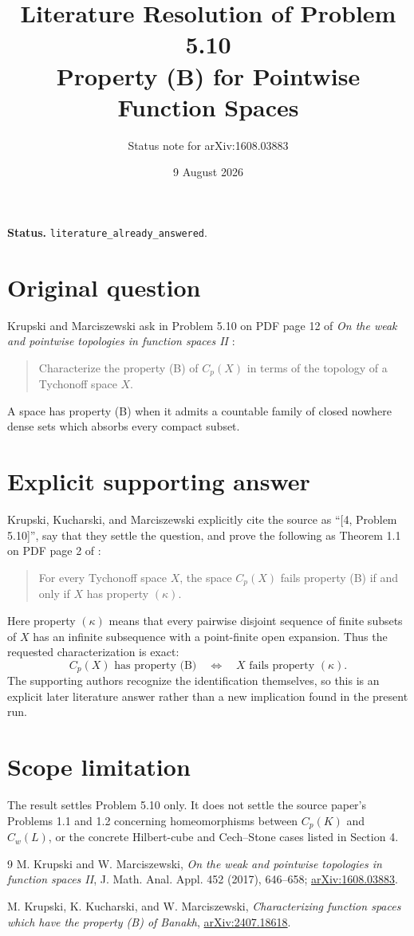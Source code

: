 \documentclass[10pt]{article}
\title{Literature Resolution of Problem 5.10\\
\large Property (B) for Pointwise Function Spaces}
\author{Status note for arXiv:1608.03883}
\date{9 August 2026}
\newcommand{\Cp}{C_p}
\begin{document}
\maketitle

\noindent\textbf{Status.} \texttt{literature\_already\_answered}.

\section*{Original question}
Krupski and Marciszewski ask in Problem 5.10 on PDF page 12 of
\emph{On the weak and pointwise topologies in function spaces II}
\cite{KM2017}:
\begin{quote}
Characterize the property (B) of $\Cp(X)$ in terms of the topology of a
Tychonoff space $X$.
\end{quote}
A space has property (B) when it admits a countable family of closed nowhere
dense sets which absorbs every compact subset.

\section*{Explicit supporting answer}
Krupski, Kucharski, and Marciszewski explicitly cite the source as
``[4, Problem 5.10]'', say that they settle the question, and prove the
following as Theorem 1.1 on PDF page 2 of \cite{KKM2024}:
\begin{quote}
For every Tychonoff space $X$, the space $\Cp(X)$ fails property (B) if and
only if $X$ has property $(\kappa)$.
\end{quote}
Here property $(\kappa)$ means that every pairwise disjoint sequence of finite
subsets of $X$ has an infinite subsequence with a point-finite open expansion.
Thus the requested characterization is exact:
\[
  \Cp(X)\text{ has property (B)}
  \quad\Longleftrightarrow\quad
  X\text{ fails property }(\kappa).
\]
The supporting authors recognize the identification themselves, so this is an
explicit later literature answer rather than a new implication found in the
present run.

\section*{Scope limitation}
The result settles Problem 5.10 only.  It does not settle the source paper's
Problems 1.1 and 1.2 concerning homeomorphisms between $\Cp(K)$ and $C_w(L)$,
or the concrete Hilbert-cube and Cech--Stone cases listed in Section 4.

\begin{thebibliography}{9}
M. Krupski and W. Marciszewski,
\emph{On the weak and pointwise topologies in function spaces II},
J. Math. Anal. Appl. 452 (2017), 646--658;
\href{https://arxiv.org/abs/1608.03883}{arXiv:1608.03883}.

M. Krupski, K. Kucharski, and W. Marciszewski,
\emph{Characterizing function spaces which have the property (B) of Banakh},
\href{https://arxiv.org/abs/2407.18618}{arXiv:2407.18618}.
\end{thebibliography}
\end{document}
